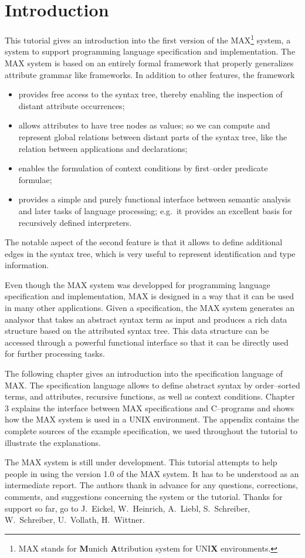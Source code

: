 \chapter{Introduction}

This tutorial gives an introduction into the first version of the
MAX\footnote{MAX stands for {\bf M}unich {\bf A}ttribution system for
UNI{\bf X} environments.} system, a system to support 
programming language specification and implementation. The MAX 
system is based on an
entirely formal framework that properly generalizes attribute grammar like
frameworks. In addition to other features, the framework
\begin{itemize}
\item
provides free access to the syntax tree, thereby enabling the inspection
of distant attribute occurrences;
\item
allows attributes to have tree nodes as values; so
we can compute and represent global relations between distant parts of
the syntax tree, like the relation between applications and declarations;
\item
enables the formulation of context conditions by first--order predicate
formulae;
\item
provides a simple and purely functional interface between semantic analysis
and later tasks of language processing; e.g.~it provides an excellent basis
for recursively defined interpreters.
\end{itemize}
The notable aspect of the second feature is that it allows to define additional
edges in the syntax tree, which is very useful to represent identification
and type information.

Even though the MAX system was developped for programming
language specification and implementation, MAX is designed in a way that 
it can be used in many other applications. Given a specification,
the MAX system generates an analysor
that takes an abstract syntax term as input and produces a 
rich data structure based on the attributed syntax tree. This data
structure can be accessed through a powerful functional interface so 
that it can be directly used for further processing tasks.


The following chapter gives an introduction into the specification language
of MAX. The specification language allows to define abstract syntax
by order--sorted terms, and attributes, recursive functions, as well as
context conditions.
Chapter 3 explains the interface between MAX specifications and 
C--programs and shows how the MAX system is used in a UNIX environment.
The appendix contains the complete sources of the example specification,
we used throughout the tutorial to illustrate the explanations.


\vspace{1.5cm}

The MAX system is still under development. This tutorial attempts to 
help people in using the version 1.0 of the MAX system. It has to be
understood as an intermediate report. The authors thank in advance
for any questions,
corrections, comments, and suggestions concerning the system or the
tutorial. Thanks for support so far, go to J.~Eickel, W.~Heinrich,
A.~Liebl, S.~Schreiber, W.~Schreiber, U.~Vollath, H.~Wittner. 
